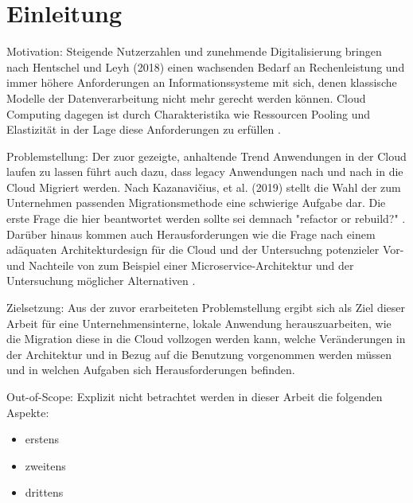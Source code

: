 
\chapter{Einleitung}


Motivation:
Steigende Nutzerzahlen und zunehmende Digitalisierung bringen nach Hentschel und Leyh (2018) einen wachsenden Bedarf an
Rechenleistung und immer höhere Anforderungen an Informationssysteme mit sich, denen klassische Modelle der Datenverarbeitung
nicht mehr gerecht werden können. Cloud Computing dagegen ist durch Charakteristika wie Ressourcen Pooling und Elastizität \cite[Vgl.][S. 2]{Mell2011} in der Lage diese Anforderungen zu erfüllen
\cite[Vgl.][S. 6]{Reinheimer2018}.

Problemstellung:
Der zuor gezeigte, anhaltende Trend Anwendungen in der Cloud laufen zu lassen führt auch dazu,
dass legacy Anwendungen nach und nach in die Cloud Migriert werden.
Nach Kazanavičius, et al. (2019) stellt die Wahl der zum Unternehmen passenden Migrationsmethode
eine schwierige Aufgabe dar. Die erste Frage die hier beantwortet werden sollte sei demnach
"refactor or rebuild?" \cite[Vgl.][S. 4]{Kazanavicius2019}.
Darüber hinaus kommen auch Herausforderungen wie die Frage nach einem adäquaten Architekturdesign
für die Cloud \cite[Vgl.][S. 14]{Pahl} und der Untersuchng potenzieler Vor- und Nachteile
von zum Beispiel einer Microservice-Architektur und der Untersuchung möglicher Alternativen
\cite[Vgl.][S. 3]{Carrasco2018}.

Zielsetzung:
Aus der zuvor erarbeiteten Problemstellung ergibt sich als Ziel dieser Arbeit für
eine Unternehmensinterne, lokale Anwendung herauszuarbeiten, wie die Migration diese in die
Cloud vollzogen werden kann, welche Veränderungen in der Architektur und in Bezug auf die Benutzung
vorgenommen werden müssen und in welchen Aufgaben sich Herausforderungen befinden.

Out-of-Scope:
Explizit nicht betrachtet werden in dieser Arbeit die folgenden Aspekte:
\begin{itemize}
\item erstens
\item zweitens
\item drittens
\end{itemize}

\pagebreak



